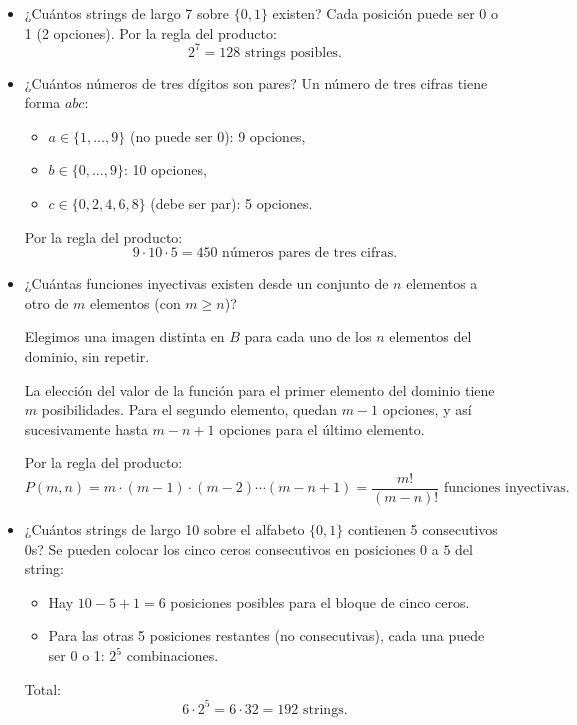 \begin{itemize}
    \item ¿Cuántos strings de largo 7 sobre $\{0,1\}$ existen?
    \ifshowsolutions
    Cada posición puede ser 0 o 1 (2 opciones). Por la regla del producto:
    \[2^7 = 128\text{ strings posibles.}\]
    \fi

    \item ¿Cuántos números de tres dígitos son pares?
    \ifshowsolutions
    Un número de tres cifras tiene forma $abc$:
    \begin{itemize}
        \item $a \in \{1,\dots,9\}$ (no puede ser 0): 9 opciones,
        \item $b \in \{0,\dots,9\}$: 10 opciones,
        \item $c \in \{0,2,4,6,8\}$ (debe ser par): 5 opciones.
    \end{itemize}
    Por la regla del producto:
    \[9 \cdot 10 \cdot 5 = 450\text{ números pares de tres cifras.}\]
    \fi

    \item ¿Cuántas funciones inyectivas existen desde un conjunto de $n$ elementos a otro de $m$ elementos (con $m \geq n$)?
    
    \ifshowsolutions
    Elegimos una imagen distinta en $B$ para cada uno de los $n$ elementos del dominio, sin repetir.

    La elección del valor de la función para el primer elemento del dominio tiene $m$ posibilidades.
    Para el segundo elemento, quedan $m - 1$ opciones, y así sucesivamente hasta $m - n + 1$ opciones para el último elemento.
    
    Por la regla del producto:
    \[P(m,n) = m \cdot (m - 1) \cdot (m - 2) \cdots (m - n + 1) = \frac{m!}{(m - n)!} \text{ funciones inyectivas.}\]
    \fi


    \item ¿Cuántos strings de largo 10 sobre el alfabeto $\{0,1\}$ contienen 5 consecutivos 0s?
    \ifshowsolutions
    Se pueden colocar los cinco ceros consecutivos en posiciones $0$ a $5$ del string:
    \begin{itemize}
        \item Hay $10 - 5 + 1 = 6$ posiciones posibles para el bloque de cinco ceros.
        \item Para las otras 5 posiciones restantes (no consecutivas), cada una puede ser 0 o 1: $2^5$ combinaciones.
    \end{itemize}
    Total:
    \[6 \cdot 2^5 = 6 \cdot 32 = 192\text{ strings.}\]
    \fi


\end{itemize}
